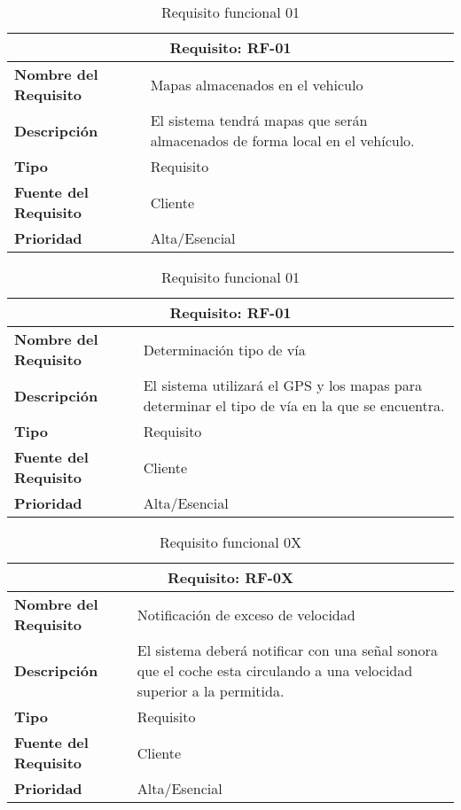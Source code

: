 \begin{table}[H]
\begin{center}
\begin{tabular}{p{} p{7cm}}
\multicolumn{2}{c}{\textbf{Requisito: RF-01} } \\
\hline \hline
\textbf{Nombre del Requisito} &  Mapas almacenados en el vehiculo\\
\hline
\textbf{Descripción} & El sistema tendrá mapas que serán almacenados de forma local en el vehículo. \\
\hline
\textbf{Tipo} & Requisito \\
\hline
\textbf{Fuente del Requisito} & Cliente \\
\hline
\textbf{Prioridad} & Alta/Esencial \\ \hline
\end{tabular}
\caption{Requisito funcional 01}
\label{tab:personal}
\end{center}
\end{table}

\begin{table}[H]
\begin{center}
\begin{tabular}{p{} p{7cm}}
\multicolumn{2}{c}{\textbf{Requisito: RF-01} } \\
\hline \hline
\textbf{Nombre del Requisito} & Determinación tipo de vía \\
\hline
\textbf{Descripción} & El sistema utilizará el GPS y los mapas para determinar el tipo de vía en la que se encuentra. \\
\hline
\textbf{Tipo} & Requisito \\
\hline
\textbf{Fuente del Requisito} & Cliente \\
\hline
\textbf{Prioridad} & Alta/Esencial \\ \hline
\end{tabular}
\caption{Requisito funcional 01}
\label{tab:personal}
\end{center}
\end{table}

\begin{table}[H]
\begin{center}
\begin{tabular}{p{} p{7cm}}
\multicolumn{2}{c}{\textbf{Requisito: RF-0X} } \\
\hline \hline
\textbf{Nombre del Requisito} & Notificación de exceso de velocidad \\
\hline
\textbf{Descripción} & El sistema deberá notificar con una señal sonora que el coche esta circulando a una velocidad superior a la permitida. \\
\hline
\textbf{Tipo} & Requisito  \\
\hline
\textbf{Fuente del Requisito} & Cliente \\
\hline
\textbf{Prioridad} & Alta/Esencial  \\ \hline
\end{tabular}
\caption{Requisito funcional 0X}
\label{tab:personal}
\end{center}
\end{table}

